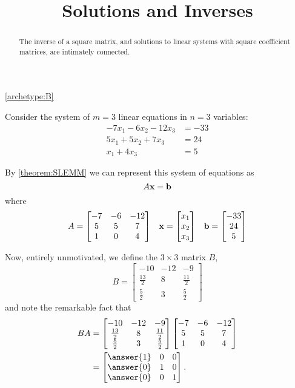 \documentclass{ximera}
\title{Solutions and Inverses}
\begin{document}
\begin{abstract}
  The inverse of a square matrix, and solutions to linear systems with square coefficient matrices, are intimately connected.
\end{abstract}
\maketitle

\begin{example}
  \ref{archetype:B} 

  Consider the system of $m=3$ linear equations in $n=3$ variables:
  \begin{align*}
    -7x_1 -6 x_2 - 12x_3 &=-33\\
    5x_1  + 5x_2 + 7x_3 &=24\\
    x_1 +4x_3 &=5
  \end{align*}
  
  By \ref{theorem:SLEMM} we can represent this system of equations as
  \[
    A\mathbf{x}=\mathbf{b}
  \]
  where
  \begin{align*}
    A=\begin{bmatrix}
      -7&-6&-12\\
      5&5&7\\
      1&0&4
    \end{bmatrix}
       &&\mathbf{x}=\begin{bmatrix}x_1\\x_2\\x_3\end{bmatrix}&&\mathbf{b}=\begin{bmatrix}-33\\24\\5\end{bmatrix}
  \end{align*}
  
  Now, entirely unmotivated, we define the $3\times 3$ matrix $B$,
  \[
    B=\begin{bmatrix}
      -10 & -12 & -9\\
      \frac{13}{2} & 8 & \frac{11}{2}\\
      \frac{5}{2} & 3 & \frac{5}{2}
    \end{bmatrix}
  \]
  and note the remarkable fact that
  \begin{align*}
    BA &=\begin{bmatrix}
      -10 & -12 & -9\\
      \frac{13}{2} & 8 & \frac{11}{2}\\
      \frac{5}{2} & 3 & \frac{5}{2}
    \end{bmatrix}\begin{bmatrix}
      -7&-6&-12\\
      5&5&7\\
      1&0&4
    \end{bmatrix} \\
       &=
         \begin{bmatrix}
           \answer{1} & 0 & 0\\
           \answer{0} & 1 & 0\\
           \answer{0} & 0 & 1
         \end{bmatrix}.
  \end{align*}
  

\end{example}
\end{document}

